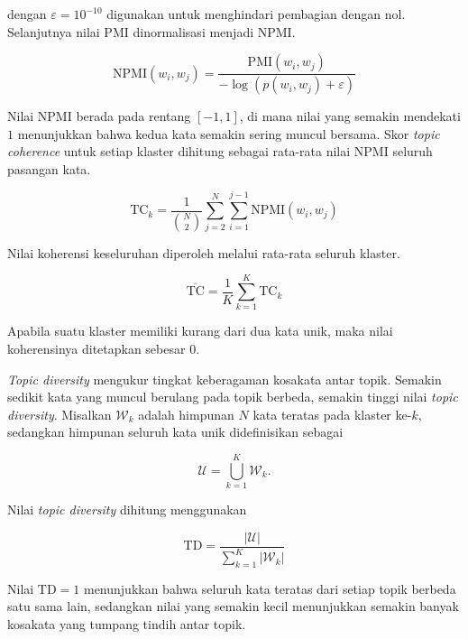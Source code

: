 dengan $\varepsilon = 10^{-10}$ digunakan untuk menghindari pembagian
dengan nol. Selanjutnya nilai PMI dinormalisasi menjadi NPMI.

\begin{equation}
    \mathrm{NPMI}(w_i,w_j)
    =
    \frac{\mathrm{PMI}(w_i,w_j)}
    {-\log(p(w_i,w_j)+\varepsilon)}
    \label{eq:npmi}
\end{equation}

Nilai NPMI berada pada rentang $[-1,1]$, di mana nilai yang semakin
mendekati $1$ menunjukkan bahwa kedua kata semakin sering muncul
bersama. Skor \textit{topic coherence} untuk setiap klaster dihitung
sebagai rata-rata nilai NPMI seluruh pasangan kata.

\begin{equation}
    \mathrm{TC}_k
    =
    \frac{1}{\binom{N}{2}}
    \sum_{j=2}^{N}
    \sum_{i=1}^{j-1}
    \mathrm{NPMI}(w_i,w_j)
    \label{eq:tc_cluster}
\end{equation}

Nilai koherensi keseluruhan diperoleh melalui rata-rata seluruh klaster.

\begin{equation}
    \overline{\mathrm{TC}}
    =
    \frac{1}{K}
    \sum_{k=1}^{K}
    \mathrm{TC}_k
    \label{eq:tc_mean}
\end{equation}

Apabila suatu klaster memiliki kurang dari dua kata unik, maka nilai
koherensinya ditetapkan sebesar $0$.

\textit{Topic diversity} mengukur tingkat keberagaman kosakata antar
topik. Semakin sedikit kata yang muncul berulang pada topik berbeda,
semakin tinggi nilai \textit{topic diversity}. Misalkan $\mathcal{W}_k$
adalah himpunan $N$ kata teratas pada klaster ke-$k$, sedangkan himpunan
seluruh kata unik didefinisikan sebagai

\[
\mathcal{U}
=
\bigcup_{k=1}^{K}\mathcal{W}_k.
\]

Nilai \textit{topic diversity} dihitung menggunakan

\begin{equation}
    \mathrm{TD}
    =
    \frac{|\mathcal{U}|}
    {\displaystyle\sum_{k=1}^{K}|\mathcal{W}_k|}
    \label{eq:td}
\end{equation}

Nilai $\mathrm{TD}=1$ menunjukkan bahwa seluruh kata teratas dari setiap
topik berbeda satu sama lain, sedangkan nilai yang semakin kecil
menunjukkan semakin banyak kosakata yang tumpang tindih antar topik.

